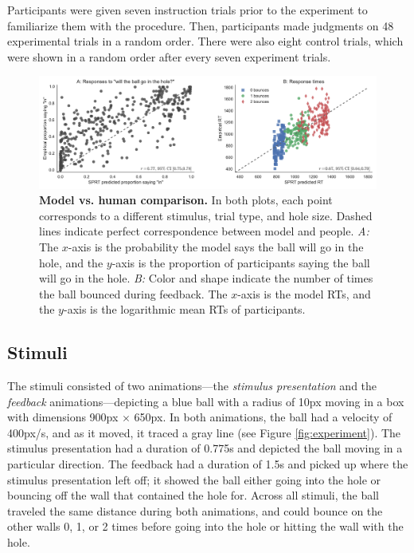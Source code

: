 \documentclass[10pt,letterpaper]{article}
\begin{document}
Participants were given seven instruction trials prior to the experiment to familiarize them with the procedure.
Then, participants made judgments on 48 experimental trials in a random order.
There were also eight control trials, which were shown in a random order after every seven experiment trials.

\begin{figure}[t]
    \begin{center}
        \includegraphics[width=\textwidth]{figures/model_results.pdf}
        \caption{\textbf{Model vs. human comparison.} 
        In both plots, each point corresponds to a different stimulus, trial type, and hole size. 
        Dashed lines indicate perfect correspondence between model and people. 
        \emph{A:} The $x$-axis is the probability the model says the ball will go in the hole, and the $y$-axis is the proportion of participants saying the ball will go in the hole. 
        \emph{B:} Color and shape indicate the number of times the ball bounced during feedback. 
        The $x$-axis is the model RTs, and the $y$-axis is the logarithmic mean RTs of participants.}
        \label{fig:model-results}
    \end{center}
\end{figure}

\subsection{Stimuli}

The stimuli consisted of two animations---the \emph{stimulus presentation} and the \emph{feedback} animations---depicting a blue ball with a radius of 10px moving in a box with dimensions 900px $\times$ 650px.
In both animations, the ball had a velocity of 400px/s, and as it moved, it traced a gray line (see Figure \ref{fig:experiment}).
The stimulus presentation had a duration of 0.775s and depicted the ball moving in a particular direction.
The feedback had a duration of 1.5s and picked up where the stimulus presentation left off; it showed the ball either going into the hole or bouncing off the wall that contained the hole for.
Across all stimuli, the ball traveled the same distance during both animations, and could bounce on the other walls 0, 1, or 2 times before going into the hole or hitting the wall with the hole.
\end{document}
